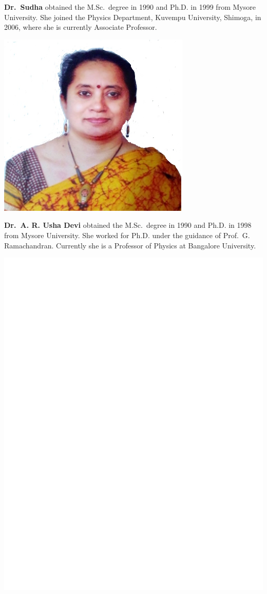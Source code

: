 \textbf{Dr.\ Sudha} obtained the M.Sc.\ degree in 1990 and Ph.D. in 1999 from Mysore University. She joined the Physics Department, Kuvempu University, Shimoga, in 2006, where she is currently Associate Professor.
\bigskip

\centerline{\includegraphics[scale=0.8]{authorsphotos/Prof_A_R_Usha_Devi.eps}}
\medskip 

\noindent
\textbf{Dr.\ A. R. Usha Devi} obtained the M.Sc.\ degree in 1990 and Ph.D. in 1998 from Mysore University. She worked for Ph.D. under the guidance of Prof.\ G. 
Ramachandran. Currently she is a Professor of Physics at Bangalore University.
\bigskip

\centerline{\includegraphics[scale=.1]{authorsphotos/A_K_RajaGopal.eps}}
\smallskip

